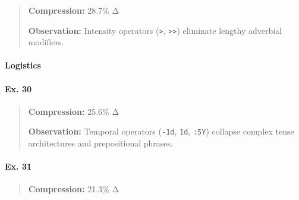 \begin{Shaded}
\begin{Shaded}
\begin{Shaded}
\begin{Shaded}
\begin{Shaded}
\begin{Shaded}
\begin{Shaded}
\begin{Shaded}
\begin{Shaded}
\begin{quote}
\textbf{Compression:} 28.7\% Δ

\textbf{Observation:} Intensity operators (\texttt{\textgreater{}},
\texttt{\textgreater{}\textgreater{}}) eliminate lengthy adverbial
modifiers.
\end{quote}

\paragraph{Logistics}\label{logistics}

\paragraph{Ex. 30}\label{ex.-30}

\begin{Shaded}
\begin{Highlighting}[]
\end{Highlighting}
\end{Shaded}

\begin{quote}
\textbf{Compression:} 25.6\% Δ

\textbf{Observation:} Temporal operators (\texttt{-1d}, \texttt{1d},
\texttt{:5Y}) collapse complex tense architectures and prepositional
phrases.
\end{quote}

\paragraph{Ex. 31}\label{ex.-31}

\begin{Shaded}
\begin{Highlighting}[]
\end{Highlighting}
\end{Shaded}

\begin{quote}
\textbf{Compression:} 21.3\% Δ


\end{quote}
\end{Shaded}
\end{Shaded}
\end{Shaded}
\end{Shaded}
\end{Shaded}
\end{Shaded}
\end{Shaded}
\end{Shaded}
\end{Shaded}
